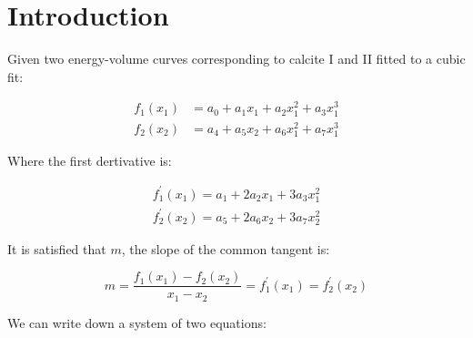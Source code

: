 \documentclass[12pt]{article}
\begin{document}
\section{Introduction}

Given two energy-volume curves corresponding
to calcite I and II fitted to a cubic fit:

\begin{align}
f_{1} (x_1) &= a_{0} + a_{1} x_{1} + a_{2} x_{1}^{2} + a_{3} x_{1}^{3} \label{f1} \\
f_{2} (x_2) &= a_{4} + a_{5} x_{2} + a_{6} x_{1}^{2} + a_{7} x_{1}^{3} \label{f2}
\end{align}

Where the first dertivative is:

\begin{align}
f_{1}^{\prime} (x_1) = a_{1} + 2a_{2} x_{1} + 3a_{3} x_{1}^{2} \label{f1prime} \\
f_{2}^{\prime} (x_2) = a_{5} + 2a_{6} x_{2} + 3a_{7} x_{2}^{2} \label{f2prime} 
\end{align}

It is satisfied that $m$, the slope of the common tangent is:

\begin{equation}
\label{m}
m = \frac{f_{1} (x_1) - f_{2} (x_2)}{x_{1} - x_{2}} = f_{1}^{\prime} (x_1) = f_{2}^{\prime} (x_2) 
\end{equation}

We can write down a system of two equations:
\end{document}
